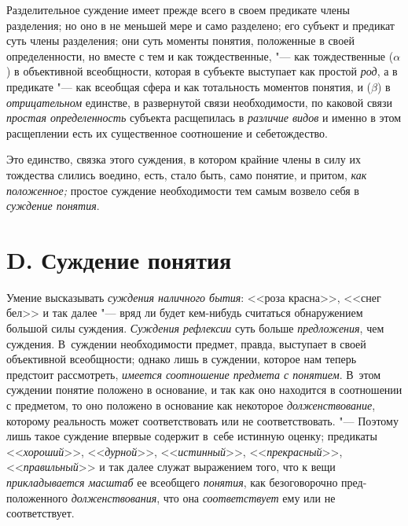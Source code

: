 Разделительное суждение имеет прежде всего в своем предикате
члены разделения; но оно в не меньшей мере и само разделено; его субъект и
предикат суть члены разделения; они суть моменты понятия, положенные в
своей определенности, но вместе с тем и как тождественные, "---
как тождественные ($\alpha $) в объективной всеобщности,
которая в субъекте выступает как простой
{\em род}, а в предикате
"--- как всеобщая сфера и как тотальность моментов понятия, и
($\beta $) в {\em отрицательном}
единстве, в развернутой связи необходимости, по каковой связи
{\em простая определенность}
субъекта расщепилась в
{\em различие видов} и
именно в этом расщеплении есть их существенное соотношение и
себетождество.

Это единство, связка этого суждения, в котором крайние члены в
силу их тождества слились воедино, есть, стало быть, само понятие, и
притом, {\em как положенное;}
простое суждение необходимости тем самым возвело себя в
{\em суждение понятия}.

\section[D. Суждение понятия]{D. Суждение понятия}

Умение высказывать
{\em суждения наличного бытия}:
<<роза красна>>, <<снег бел>> и так далее "--- вряд
ли будет кем-нибудь считаться обнаружением большой силы суждения.
{\em Суждения рефлексии}
суть больше
{\em предложения}, чем
суждения. В~суждении необходимости предмет, правда,
выступает в своей объективной всеобщности; однако лишь в суждении, которое
нам теперь предстоит рассмотреть,
{\em имеется соотношение предмета с
понятием}. В~этом суждении понятие положено в основание, и
так как оно находится в соотношении с предметом, то оно положено в
основание как некоторое
{\em долженствование},
которому реальность может соответствовать или не
соответствовать. "--- Поэтому лишь такое суждение впервые
содержит в~себе истинную оценку; предикаты
<<{\em хороший}>>,
<<{\em дурной}>>,
<<{\em истинный}>>,
<<{\em прекрасный}>>,
<<{\em правильный}>> и так
далее служат выражением того, что к вещи
{\em прикладывается масштаб} ее всеобщего
{\em понятия}, как
безоговорочно пред-положенного
{\em долженствования},
что она
{\em соответствует} ему
или не соответствует.

